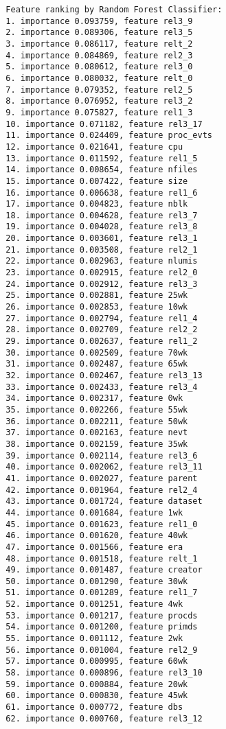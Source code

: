 \begin{verbatim}
  Feature ranking by Random Forest Classifier:
  1. importance 0.093759, feature rel3_9
  2. importance 0.089306, feature rel3_5
  3. importance 0.086117, feature relt_2
  4. importance 0.084869, feature rel2_3
  5. importance 0.080612, feature rel3_0
  6. importance 0.080032, feature relt_0
  7. importance 0.079352, feature rel2_5
  8. importance 0.076952, feature rel3_2
  9. importance 0.075827, feature rel1_3
  10. importance 0.071182, feature rel3_17
  11. importance 0.024409, feature proc_evts
  12. importance 0.021641, feature cpu
  13. importance 0.011592, feature rel1_5
  14. importance 0.008654, feature nfiles
  15. importance 0.007422, feature size
  16. importance 0.006638, feature rel1_6
  17. importance 0.004823, feature nblk
  18. importance 0.004628, feature rel3_7
  19. importance 0.004028, feature rel3_8
  20. importance 0.003601, feature rel3_1
  21. importance 0.003508, feature rel2_1
  22. importance 0.002963, feature nlumis
  23. importance 0.002915, feature rel2_0
  24. importance 0.002912, feature rel3_3
  25. importance 0.002881, feature 25wk
  26. importance 0.002853, feature 10wk
  27. importance 0.002794, feature rel1_4
  28. importance 0.002709, feature rel2_2
  29. importance 0.002637, feature rel1_2
  30. importance 0.002509, feature 70wk
  31. importance 0.002487, feature 65wk
  32. importance 0.002467, feature rel3_13
  33. importance 0.002433, feature rel3_4
  34. importance 0.002317, feature 0wk
  35. importance 0.002266, feature 55wk
  36. importance 0.002211, feature 50wk
  37. importance 0.002163, feature nevt
  38. importance 0.002159, feature 35wk
  39. importance 0.002114, feature rel3_6
  40. importance 0.002062, feature rel3_11
  41. importance 0.002027, feature parent
  42. importance 0.001964, feature rel2_4
  43. importance 0.001724, feature dataset
  44. importance 0.001684, feature 1wk
  45. importance 0.001623, feature rel1_0
  46. importance 0.001620, feature 40wk
  47. importance 0.001566, feature era
  48. importance 0.001518, feature relt_1
  49. importance 0.001487, feature creator
  50. importance 0.001290, feature 30wk
  51. importance 0.001289, feature rel1_7
  52. importance 0.001251, feature 4wk
  53. importance 0.001217, feature procds
  54. importance 0.001200, feature primds
  55. importance 0.001112, feature 2wk
  56. importance 0.001004, feature rel2_9
  57. importance 0.000995, feature 60wk
  58. importance 0.000896, feature rel3_10
  59. importance 0.000884, feature 20wk
  60. importance 0.000830, feature 45wk
  61. importance 0.000772, feature dbs
  62. importance 0.000760, feature rel3_12

\end{verbatim}
